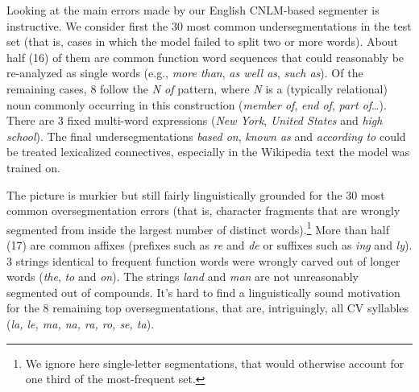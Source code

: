 
Looking at the main errors made by our English CNLM-based segmenter is
instructive. We consider first the 30 most common undersegmentations
in the test set (that is, cases in which the model failed to split two
or more words). About half (16) of them are common function word
sequences that could reasonably be re-analyzed as single words (e.g.,
\emph{more than}, \emph{as well as}, \emph{such as}). Of the remaining
cases, 8 follow the \emph{N of} pattern, where \emph{N} is a
(typically relational) noun commonly occurring in this construction
(\emph{member of}, \emph{end of}, \emph{part of}\ldots). There are 3
fixed multi-word expressions (\emph{New York}, \emph{United States}
and \emph{high school}). The final undersegmentations \emph{based on}, \emph{known as} and
\emph{according to} could be treated lexicalized connectives,
especially in the Wikipedia text the model was trained on.

The picture is murkier but still fairly linguistically grounded
for the 30 most common oversegmentation errors (that is, character
fragments that are wrongly segmented from inside the largest number of
distinct words).\footnote{We ignore here single-letter segmentations,
  that would otherwise account for one third of the most-frequent
  set.}  More than half (17) are common affixes (prefixes such as
\emph{re} and \emph{de} or suffixes such as \emph{ing} and
\emph{ly}). 3 strings identical to frequent
function words were wrongly carved out of longer words (\emph{the},
\emph{to} and \emph{on}). %
The strings \emph{land} and \emph{man} are not unreasonably segmented
out of compounds. It's hard to find a linguistically sound motivation
for the 8 remaining top oversegmentations, that are, intriguingly, all CV
syllables (\emph{la, le, ma, na, ra, ro, se, ta}).


